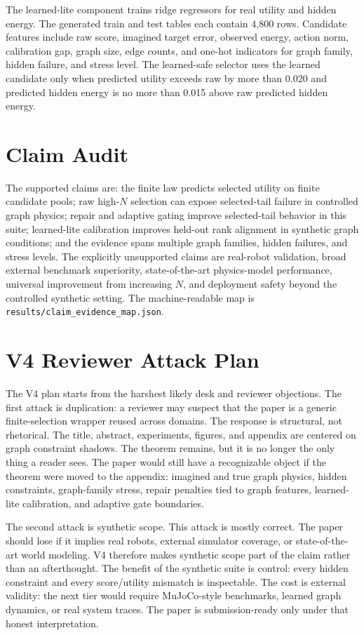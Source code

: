 \documentclass{article}
\begin{document}
The learned-lite component trains ridge regressors for real utility and hidden energy.  The generated train and test tables each contain 4,800 rows.  Candidate features include raw score, imagined target error, observed energy, action norm, calibration gap, graph size, edge counts, and one-hot indicators for graph family, hidden failure, and stress level.  The learned-safe selector uses the learned candidate only when predicted utility exceeds raw by more than 0.020 and predicted hidden energy is no more than 0.015 above raw predicted hidden energy.

\section{Claim Audit}

The supported claims are: the finite law predicts selected utility on finite candidate pools; raw high-$N$ selection can expose selected-tail failure in controlled graph physics; repair and adaptive gating improve selected-tail behavior in this suite; learned-lite calibration improves held-out rank alignment in synthetic graph conditions; and the evidence spans multiple graph families, hidden failures, and stress levels.  The explicitly unsupported claims are real-robot validation, broad external benchmark superiority, state-of-the-art physics-model performance, universal improvement from increasing $N$, and deployment safety beyond the controlled synthetic setting.  The machine-readable map is \texttt{results/claim\_evidence\_map.json}.

\section{V4 Reviewer Attack Plan}

The V4 plan starts from the harshest likely desk and reviewer objections.  The
first attack is duplication: a reviewer may suspect that the paper is a generic
finite-selection wrapper reused across domains.  The response is structural,
not rhetorical.  The title, abstract, experiments, figures, and appendix are
centered on graph constraint shadows.  The theorem remains, but it is no longer
the only thing a reader sees.  The paper would still have a recognizable object
if the theorem were moved to the appendix: imagined and true graph physics,
hidden constraints, graph-family stress, repair penalties tied to graph
features, learned-lite calibration, and adaptive gate boundaries.

The second attack is synthetic scope.  This attack is mostly correct.  The
paper should lose if it implies real robots, external simulator coverage, or
state-of-the-art world modeling.  V4 therefore makes synthetic scope part of
the claim rather than an afterthought.  The benefit of the synthetic suite is
control: every hidden constraint and every score/utility mismatch is inspectable.
The cost is external validity: the next tier would require MuJoCo-style
benchmarks, learned graph dynamics, or real system traces.  The paper is
submission-ready only under that honest interpretation.
\end{document}
